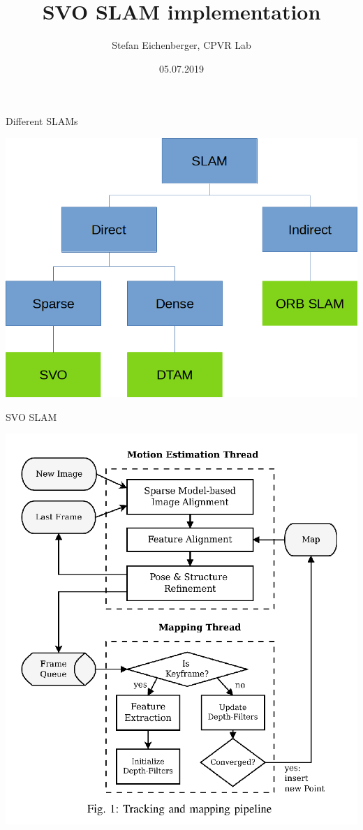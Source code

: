 \documentclass[aspectratio=169]{beamer}
\begin{document}
\obeylines

\title[SVO SLAM implementation]{SVO SLAM implementation}
\author{Stefan Eichenberger, CPVR Lab}
\date{05.07.2019}


\begin{frame}
  \titlepage\thispagestyle{empty}
\end{frame}

\begin{frame}{Different SLAMs}
  \begin{center}
    \includegraphics[height=0.9\textheight]{./img/slam_modes.png}
  \end{center}
\end{frame}

\begin{frame}{SVO SLAM}
  \begin{center}
    \includegraphics[height=0.9\textheight]{./img/svo_pipeline.png}
  \end{center}
\end{frame}
\end{document}
